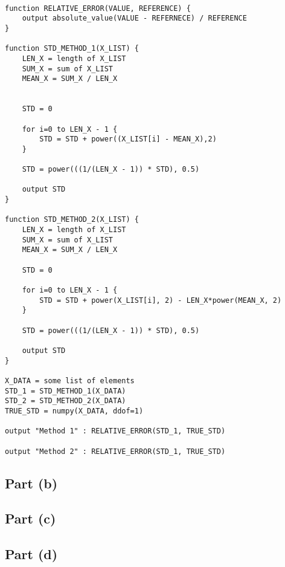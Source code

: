 \documentclass[reprint, amsmath,amssymb, aps]{revtex4-2}
\begin{document}
        \begin{lstlisting}

function RELATIVE_ERROR(VALUE, REFERENCE) {
    output absolute_value(VALUE - REFERNECE) / REFERENCE
}

function STD_METHOD_1(X_LIST) {
    LEN_X = length of X_LIST
    SUM_X = sum of X_LIST
    MEAN_X = SUM_X / LEN_X


    STD = 0

    for i=0 to LEN_X - 1 {
        STD = STD + power((X_LIST[i] - MEAN_X),2)
    }

    STD = power(((1/(LEN_X - 1)) * STD), 0.5)

    output STD
}

function STD_METHOD_2(X_LIST) {
    LEN_X = length of X_LIST
    SUM_X = sum of X_LIST
    MEAN_X = SUM_X / LEN_X

    STD = 0

    for i=0 to LEN_X - 1 {
        STD = STD + power(X_LIST[i], 2) - LEN_X*power(MEAN_X, 2)
    }

    STD = power(((1/(LEN_X - 1)) * STD), 0.5)

    output STD
}

X_DATA = some list of elements
STD_1 = STD_METHOD_1(X_DATA)
STD_2 = STD_METHOD_2(X_DATA)
TRUE_STD = numpy(X_DATA, ddof=1)

output "Method 1" : RELATIVE_ERROR(STD_1, TRUE_STD)

output "Method 2" : RELATIVE_ERROR(STD_1, TRUE_STD)

        \end{lstlisting}

    \subsection{Part (b)}

    \subsection{Part (c)}



    \subsection{Part (d)}
\end{document}
